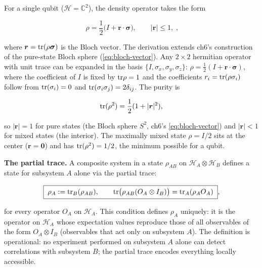 For a single qubit ($\mathcal{H} = \mathbb{C}^2$), the density operator takes the form
\begin{linenomath}
\begin{equation}
\boxed{\;
\rho = \frac12\bigl(I + \bm r \cdot \bm \sigma\bigr),
\qquad
\lvert\bm r\rvert \le 1,
\;},
\label{eq:bloch-ball}
\end{equation}
\end{linenomath}
where $\bm r = \mathrm{tr}(\rho \bm \sigma)$ is the Bloch vector. The derivation extends ch6's construction of the pure-state Bloch sphere (\eqref{eq:bloch-vector}). Any $2\times2$ hermitian operator with unit trace can be expanded in the basis $\{I, \sigma_x, \sigma_y, \sigma_z\}$: $\rho = \frac12(I + \bm r \cdot \bm \sigma)$, where the coefficient of $I$ is fixed by $\mathrm{tr}\rho = 1$ and the coefficients $r_i = \mathrm{tr}(\rho \sigma_i)$ follow from $\mathrm{tr}(\sigma_i) = 0$ and $\mathrm{tr}(\sigma_i\sigma_j) = 2\delta_{ij}$. The purity is
\begin{linenomath}
\begin{equation}
\mathrm{tr}(\rho^2) = \frac12(1 + \lvert\bm r\rvert^2),
\end{equation}
\end{linenomath}
so $\lvert\bm r\rvert = 1$ for pure states (the Bloch sphere $S^2$, ch6's \eqref{eq:bloch-vector}) and $\lvert\bm r\rvert < 1$ for mixed states (the interior). The maximally mixed state $\rho = I/2$ sits at the center ($\bm r = \bm 0$) and has $\mathrm{tr}(\rho^2) = 1/2$, the minimum possible for a qubit.

\medskip\noindent\textbf{The partial trace.}
A composite system in a state $\rho_{AB}$ on $\mathcal{H}_A \otimes \mathcal{H}_B$ defines a state for subsystem $A$ alone via the partial trace:
\begin{linenomath}
\begin{equation}
\boxed{\;
\rho_A := \mathrm{tr}_B(\rho_{AB}),
\qquad
\mathrm{tr}\bigl(\rho_{AB}(O_A \otimes I_B)\bigr) = \mathrm{tr}_A(\rho_A O_A)
\;},
\label{eq:partial-trace}
\end{equation}
\end{linenomath}
for every operator $O_A$ on $\mathcal{H}_A$. This condition defines $\rho_A$ uniquely: it is the operator on $\mathcal{H}_A$ whose expectation values reproduce those of all observables of the form $O_A \otimes I_B$ (observables that act only on subsystem $A$). The definition is operational: no experiment performed on subsystem $A$ alone can detect correlations with subsystem $B$; the partial trace encodes everything locally accessible.

